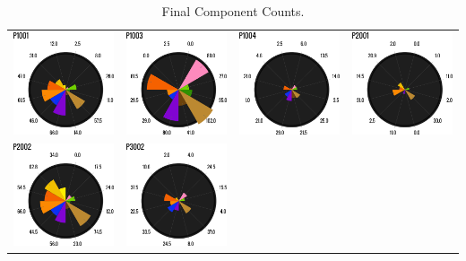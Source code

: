 %

\begin{table}[htbp]
\small
  \centering
  \caption{Final Component Counts. }
    \begin{tabular}{p{1.25in}p{1.25in}p{1.25in}p{1.25in}}
    \toprule
\includegraphics[width=1.25in]{./images/cont4/polar_charts/p1001}&
\includegraphics[width=1.25in]{./images/cont4/polar_charts/p1003}&
\includegraphics[width=1.25in]{./images/cont4/polar_charts/p1004}&
\includegraphics[width=1.25in]{./images/cont4/polar_charts/p2001}\\
\includegraphics[width=1.25in]{./images/cont4/polar_charts/p2002}&
\includegraphics[width=1.25in]{./images/cont4/polar_charts/p3002}&

\end{tabular}
\end{table}
